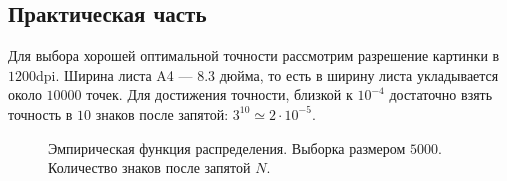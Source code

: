\documentclass[12pt, a4paper]{article}
\begin{document}
\subsection{Практическая часть}
Для выбора хорошей оптимальной точности рассмотрим разрешение картинки в $1200$dpi. Ширина листа A4 --- $8.3$ дюйма, то есть в ширину листа укладывается около $10000$ точек. Для достижения точности, близкой к $10^{-4}$ достаточно взять точность в $10$ знаков после запятой: $3^{10} \simeq 2\cdot10^{-5}$. 
\begin{figure}[H]
\caption{Эмпирическая функция распределения. Выборка размером $5000$. Количество знаков после запятой $N$.}
\end{figure}
\end{document}
